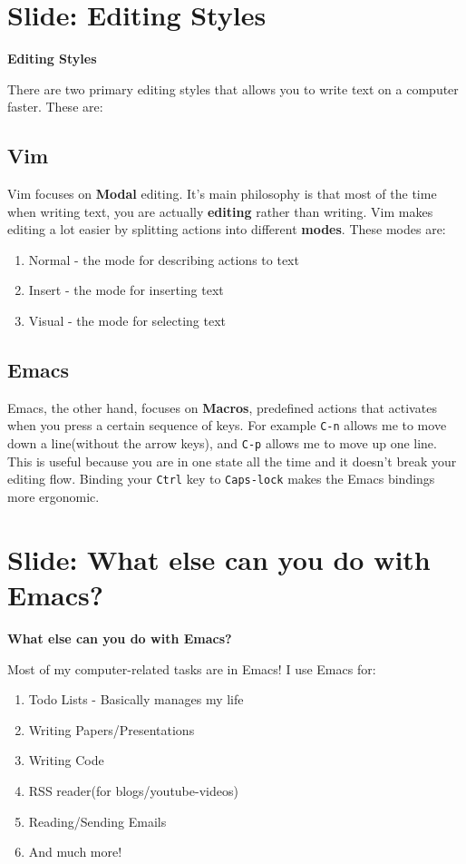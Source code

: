 \documentclass[11pt]{article}
\begin{document}
\section{Slide: Editing Styles}
\label{sec:orgb1c53fd}
\textbf{Editing Styles}

There are two primary editing styles that allows you to write text on a computer faster.
These are:
\subsection{Vim}
\label{sec:orga440c5c}
Vim focuses on \textbf{Modal} editing. It's main philosophy is that most of the time
when writing text, you are actually \textbf{editing} rather than writing. Vim makes
editing a lot easier by splitting actions into different \textbf{modes}. These modes are:
\begin{enumerate}
\item Normal - the mode for describing actions to text
\item Insert - the mode for inserting text
\item Visual - the mode for selecting text
\end{enumerate}
\subsection{Emacs}
\label{sec:orgab4a264}
Emacs, the other hand, focuses on \textbf{Macros}, predefined actions that activates
when you press a certain sequence of keys. For example \texttt{C-n} allows me to move
down a line(without the arrow keys), and \texttt{C-p} allows me to move up one line.
This is useful because you are in one state all the time and it doesn't break
your editing flow. Binding your \texttt{Ctrl} key to \texttt{Caps-lock} makes the Emacs
bindings more ergonomic.
\section{Slide: What else can you do with Emacs?}
\label{sec:orgfc27307}
\textbf{What else can you do with Emacs?}

Most of my computer-related tasks are in Emacs! I use Emacs for:
\begin{enumerate}
\item Todo Lists - Basically manages my life
\item Writing Papers/Presentations
\item Writing Code
\item RSS reader(for blogs/youtube-videos)
\item Reading/Sending Emails
\item And much more!
\end{enumerate}
\end{document}
